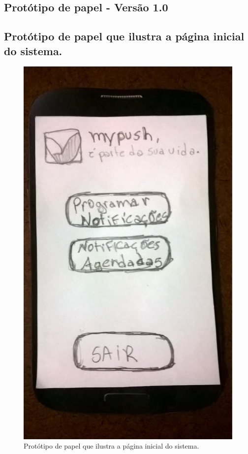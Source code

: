 \begin{anexosenv}
\chapter{Protótipo de papel - Versão 1.0}

  \section*{Protótipo de papel que ilustra a página inicial do sistema.}
  
    \begin{figure}[!htbp]
      \centering
      \includegraphics[scale=0.32]{editaveis/figuras/prototipo_papel_v1/pagina_inicial}
      \caption{Protótipo de papel que ilustra a página inicial do sistema.}
      \label{pagina_inicial_v1}
    \end{figure}
  

\end{anexosenv}
